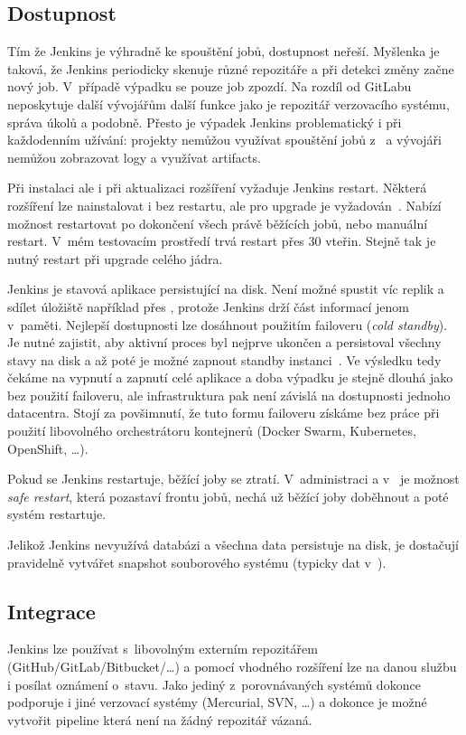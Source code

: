     \subsection{Dostupnost}
        Tím že Jenkins je výhradně ke spouštění jobů, dostupnost neřeší. Myšlenka je taková, že Jenkins periodicky skenuje různé repozitáře a při detekci změny začne nový job. V~případě výpadku se pouze job zpozdí. Na rozdíl od GitLabu neposkytuje další vývojářům další funkce jako je repozitář verzovacího systému, správa úkolů a podobně. Přesto je výpadek Jenkins problematický i při každodenním užívání: projekty nemůžou využívat spouštění jobů z~ a vývojáři nemůžou zobrazovat logy a využívat artifacts.

        Při instalaci ale i při aktualizaci rozšíření vyžaduje Jenkins restart. Některá rozšíření lze nainstalovat i bez restartu, ale pro upgrade je vyžadován~\cite{jenkins-norestart}. Nabízí možnost restartovat po dokončení všech právě běžících jobů, nebo manuální restart. V~mém testovacím prostředí trvá restart přes 30 vteřin. Stejně tak je nutný restart při upgrade celého jádra.

        Jenkins je stavová aplikace persistující na disk. Není možné spustit víc replik a sdílet úložiště například přes , protože Jenkins drží část informací jenom v~paměti. Nejlepší dostupnosti lze dosáhnout použitím failoveru (\textit{cold standby}). Je nutné zajistit, aby aktivní proces byl nejprve ukončen a persistoval všechny stavy na disk a až poté je možné zapnout standby instanci~\cite{jenkins-ha}. Ve výsledku tedy čekáme na vypnutí a zapnutí celé aplikace a doba výpadku je stejně dlouhá jako bez použití failoveru, ale infrastruktura pak není závislá na dostupnosti jednoho datacentra. Stojí za povšimnutí, že tuto formu failoveru získáme bez práce při použití libovolného orchestrátoru kontejnerů (Docker Swarm, Kubernetes, OpenShift, \ldots).

        Pokud se Jenkins restartuje, běžící joby se ztratí. V~administraci a v~ je možnost \textit{safe restart}, která pozastaví frontu jobů, nechá už běžící joby doběhnout a poté systém restartuje.

        Jelikož Jenkins nevyužívá databázi a všechna data persistuje na disk, je dostačují pravidelně vytvářet snapshot souborového systému (typicky dat v~).

    \subsection{Integrace}
        Jenkins lze používat s~libovolným externím repozitářem (GitHub/GitLab/Bitbucket/\ldots) a pomocí vhodného rozšíření lze na danou službu i posílat oznámení o~stavu. Jako jediný z~porovnávaných systémů dokonce podporuje i jiné verzovací systémy (Mercurial, SVN, \ldots) a dokonce je možné vytvořit pipeline která není na žádný repozitář vázaná.

